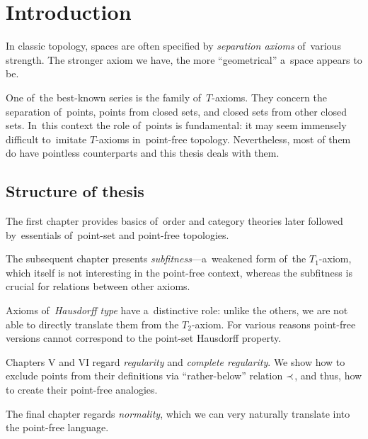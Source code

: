 \chapter*{Introduction}

In classic topology, spaces are often specified by \emph{separation axioms\/}
of~various strength.
The stronger axiom we have, the more ``geometrical'' a~space appears to be.

One of~the best-known series is the family of~$T$-axioms.
They concern the separation of~points, points from closed sets, and closed sets
from other closed sets.
In~this context the role of~points is fundamental:
it may seem immensely difficult to~imitate $T$-axioms in~point-free topology.
Nevertheless, most of them do have pointless counterparts and this thesis deals
with them.

\section*{Structure of thesis}

The first chapter provides basics of~order and category theories later followed
by~essentials of~point-set and point-free topologies.

The subsequent chapter presents \emph{subfitness\/}---a~weakened form of~the
$T_1$-axiom, which itself is not interesting in the point-free context, whereas
the subfitness is crucial for relations between other axioms.

Axioms of~\emph{Hausdorff type\/} have a~distinctive role:
unlike the others, we are not able to directly translate them from the
$T_2$-axiom.
For various reasons point-free versions cannot correspond to the point-set
Hausdorff property.

Chapters V and VI regard \emph{regularity\/} and \emph{complete regularity\/}.
We show how to exclude points from their definitions via ``rather-below''
relation $\prec$, and thus, how to create their point-free analogies.

The final chapter regards \emph{normality\/}, which we can very naturally
translate into the point-free language.
